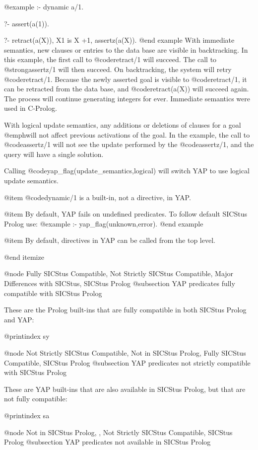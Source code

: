 {{{{{{{{{@example
:- dynamic a/1.

?- assert(a(1)).

?- retract(a(X)), X1 is X +1, assertz(a(X)).
@end example
With immediate semantics, new clauses or entries to the data base are
visible in backtracking. In this example, the first call to
@code{retract/1} will succeed. The call to @strong{assertz/1} will then
succeed. On backtracking, the system will retry
@code{retract/1}. Because the newly asserted goal is visible to
@code{retract/1}, it can be retracted from the data base, and
@code{retract(a(X))} will succeed again. The process will continue
generating integers for ever. Immediate semantics were used in C-Prolog.

With logical update semantics, any additions or deletions of clauses
for a goal @emph{will not affect previous activations of the
goal}. In the example, the call to @code{assertz/1} will not see the
update performed by the @code{assertz/1}, and the query will have a
single solution.

Calling @code{yap_flag(update_semantics,logical)} will switch
YAP to use logical update semantics.

@item @code{dynamic/1} is a built-in, not a directive, in YAP.

@item By default, YAP fails on undefined predicates. To follow default
SICStus Prolog use:
@example
:- yap_flag(unknown,error).
@end example

@item By default, directives in YAP can be called from the top level.

@end itemize

@node Fully SICStus Compatible, Not Strictly SICStus Compatible, Major Differences with SICStus, SICStus Prolog
@subsection YAP predicates fully compatible with SICStus Prolog

These are the Prolog built-ins that are fully compatible in both SICStus
Prolog and YAP:

@printindex sy

@node Not Strictly SICStus Compatible, Not in SICStus Prolog, Fully SICStus Compatible, SICStus Prolog
@subsection YAP predicates not strictly compatible with SICStus Prolog

These are YAP built-ins that are also available in SICStus Prolog, but
that are not fully compatible:

@printindex sa

@node Not in SICStus Prolog, , Not Strictly SICStus Compatible, SICStus Prolog
@subsection YAP predicates not available in SICStus Prolog

}}}}}}}}}
